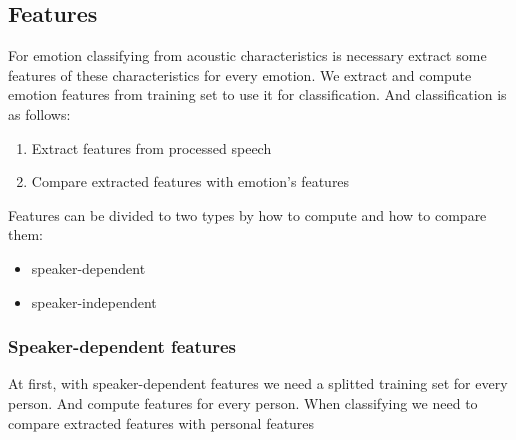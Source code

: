 \documentclass[12pt, letterpaper]{article}
\begin{document}
\subsection{Features}
For emotion classifying from acoustic characteristics is necessary extract some features of these characteristics for every emotion. We extract and compute emotion features from training set to use it for classification. And classification is as follows:
\begin{enumerate}
	\item Extract features from processed speech
	\item Compare extracted features with emotion's features
\end{enumerate}

Features can be divided to two types by how to compute and how to compare them:
\begin{itemize}
	\item speaker-dependent
	\item speaker-independent
\end{itemize}

\subsubsection{Speaker-dependent features}
At first, with speaker-dependent features we need a splitted training set for every person. And compute features for every person. When classifying we need to compare extracted features with personal features
\end{document}
